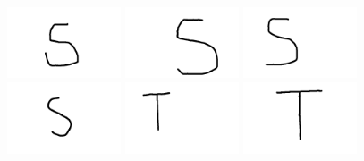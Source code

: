 \documentclass[11pt, a4paper]{article}
\begin{document}
\begin{figure}[!h]
\centering
	\begin{minipage}[b]{0.3\textwidth}
		\includegraphics[width=0.3\textwidth]{test/S1.png}
	\end{minipage}	
	\begin{minipage}[b]{0.3\textwidth}
		\includegraphics[width=0.3\textwidth]{test/S2.png}
	\end{minipage}	
	\begin{minipage}[b]{0.3\textwidth}
		\includegraphics[width=0.3\textwidth]{test/S3.png}
	\end{minipage}	
	\begin{minipage}[b]{0.3\textwidth}
		\includegraphics[width=0.3\textwidth]{test/S4.png}
	\end{minipage}
	\begin{minipage}[b]{0.3\textwidth}
		\includegraphics[width=0.3\textwidth]{test/T1.png}
	\end{minipage}	
	\begin{minipage}[b]{0.3\textwidth}
		\includegraphics[width=0.3\textwidth]{test/T2.png}

\end{minipage}
\end{figure}
\end{document}
